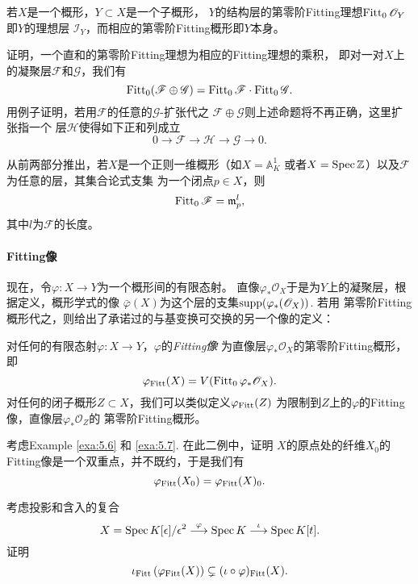 \begin{exe}\label{exe:5.11}
    \begin{compactenum}[(a)]
        \item 若$X$是一个概形，$Y\subset X$是一个子概形，
        $Y$的结构层的第零阶Fitting理想$\operatorname{Fitt}_0\mathscr O_Y$即$Y$的理想层
        $\mathscr I_Y$，而相应的第零阶Fitting概形即$Y$本身。
        \item 证明，一个直和的第零阶Fitting理想为相应的Fitting理想的乘积，
        即对一对$X$上的凝聚层$\mathscr F$和$\mathscr G$，我们有
        \[
            \operatorname{Fitt}_0(\mathscr F\oplus \mathscr G)=\operatorname{Fitt}_0\mathscr F\cdot \operatorname{Fitt}_0\mathscr G.
        \]
        用例子证明，若用$\mathscr F$的任意的$\mathscr G$-扩张代之
        $\mathscr F\oplus \mathscr G$则上述命题将不再正确，这里扩张指一个
        层$\mathscr H$使得如下正和列成立
        \[
            0 \longrightarrow \mathscr{F} \longrightarrow \mathscr{H} 
            \longrightarrow \mathscr{G} \longrightarrow 0.
        \]
        \item 从前两部分推出，若$X$是一个正则一维概形（如$X=\mathbb A_K^1$
        或者$X=\operatorname{Spec} \mathbb Z$）以及$\mathscr F$为任意的层，其集合论式支集
        为一个闭点$p\in X$，则 
        \[
            \operatorname{Fitt}_0\mathscr F=\mathfrak{m}_p^l,
        \]
        其中$l$为$\mathscr F$的长度。
    \end{compactenum}
\end{exe}

\paragraph*{Fitting像} 现在，令$\varphi:X\to Y$为一个概形间的有限态射。
直像$\varphi_*\mathscr O_X$于是为$Y$上的凝聚层，根据定义，概形学式的像
$\bar\varphi(X)$为这个层的支集$\operatorname{supp}(\varphi_*(\mathscr O_X))$. 若用
第零阶Fitting概形代之，则给出了承诺过的与基变换可交换的另一个像的定义：

\begin{defi}\label{defi:5.12}
    对任何的有限态射$\varphi:X\to Y$，$\varphi$的\textit{Fitting像}
    为直像层$\varphi_*\mathscr O_X$的第零阶Fitting概形，即
    \[
        \varphi_{\operatorname{Fitt}}(X)=V(\operatorname{Fitt}_0 \varphi_* \mathscr{O}_X).
    \]
    对任何的闭子概形$Z\subset X$，我们可以类似定义$\varphi_{\operatorname{Fitt}} (Z)$
    为限制到$Z$上的$\varphi$的Fitting像，直像层$\varphi_*\mathscr O_Z$的
    第零阶Fitting概形。
\end{defi}

\begin{exe}\label{exe:5.13}
    考虑Example \ref{exa:5.6} 和 \ref{exa:5.7}. 在此二例中，证明
    $X$的原点处的纤维$X_0$的Fitting像是一个双重点，并不既约，于是我们有 
    \[
        \varphi_{\operatorname{Fitt}} (X_0)=\varphi_{\operatorname{Fitt}}(X)_0.
    \]
\end{exe}

\begin{exe}\label{exe:5.14}
    考虑投影和含入的复合
    \[
        X=\operatorname{Spec} K[\epsilon] / \epsilon^2 \stackrel{\varphi}{\longrightarrow} 
        \operatorname{Spec} K \stackrel{\iota}{\longrightarrow} \operatorname{Spec} K[t] .
    \]
    证明
    \[
        \iota_{\operatorname{Fitt}}\left(\varphi_{\operatorname{Fitt}}(X)\right) 
        \subsetneq(\iota \circ \varphi)_{\operatorname{Fitt}}(X).
    \]
\end{exe}